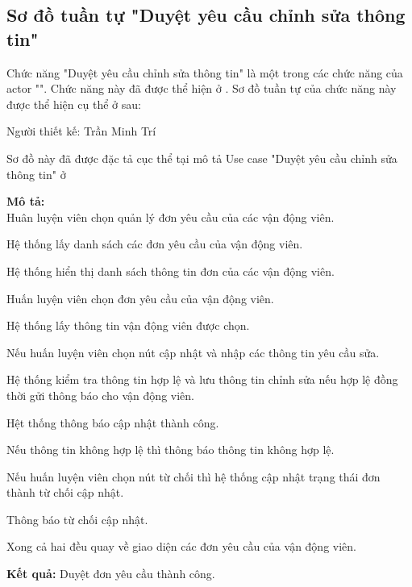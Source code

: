 \subsection{Sơ đồ tuần tự "Duyệt yêu cầu chỉnh sửa thông tin"}
\setcounter{figure}{0}

Chức năng "Duyệt yêu cầu chỉnh sửa thông tin" là một trong các chức năng của actor "".
Chức năng này đã được thể hiện ở \myref{}.
Sơ đồ tuần tự của chức năng này được thể hiện cụ thể ở \myref{} sau:

Người thiết kế: Trần Minh Trí

Sơ đồ này đã được đặc tả cục thể tại mô tả Use case
"Duyệt yêu cầu chỉnh sửa thông tin" ở 

\noindent
\textbf{Mô tả:}\\
Huân luyện viên chọn quản lý đơn yêu cầu của các vận động viên. \par
Hệ thống lấy danh sách các đơn yêu cầu của vận động viên. \par
Hệ thống hiển thị danh sách thông tin đơn của các vận động viên. \par
Huấn luyện viên chọn đơn yêu cầu của vận động viên. \par
Hệ thống lấy thông tin vận động viên được chọn. \par
Nếu huấn luyện viên chọn nút cập nhật và nhập các thông tin yêu cầu sửa. \par
Hệ thống kiểm tra thông tin hợp lệ và lưu thông tin chỉnh sửa nếu hợp lệ đồng thời gửi thông báo cho vận động viên. \par
Hệt thống thông báo cập nhật thành công. \par
Nếu thông tin không hợp lệ thì thông báo thông tin không hợp lệ. \par
Nếu huấn luyện viên chọn nút từ chối thì hệ thống cập nhật trạng thái đơn thành từ chối cập nhật. \par
Thông báo từ chối cập nhật. \par
Xong cả hai đều quay về giao diện các đơn yêu cầu của vận động viên.


\noindent
\textbf{Kết quả:} Duyệt đơn yêu cầu thành công.


